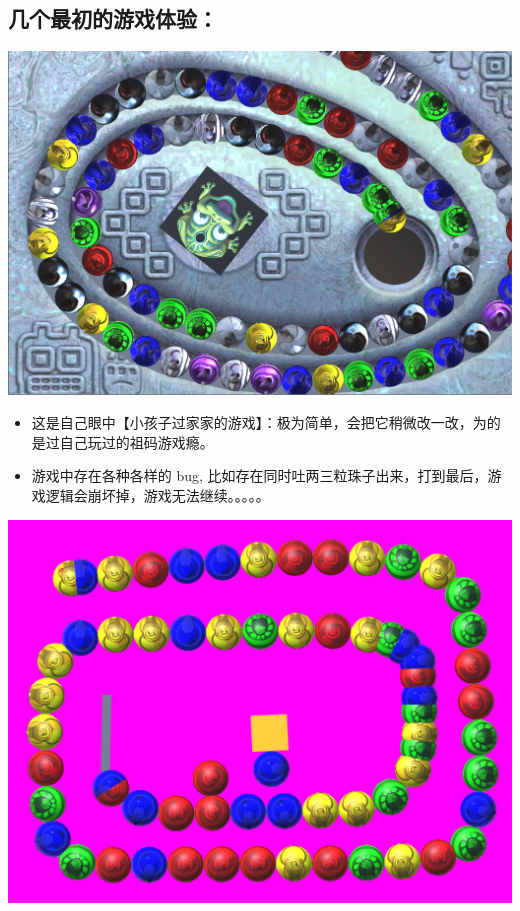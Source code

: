 \documentclass[9pt, b5paper]{article}
\begin{document}
\subsection{几个最初的游戏体验：}
\label{sec-1-1}

\includegraphics[width=.9\linewidth]{./pic/readme_20230324_102732.png}
\begin{itemize}
\item 这是自己眼中【小孩子过家家的游戏】：极为简单，会把它稍微改一改，为的是过自己玩过的祖码游戏瘾。
\item 游戏中存在各种各样的 bug, 比如存在同时吐两三粒珠子出来，打到最后，游戏逻辑会崩坏掉，游戏无法继续。。。。。
\end{itemize}

\includegraphics[width=.9\linewidth]{./pic/readme_20230323_112732.png}
\end{document}
